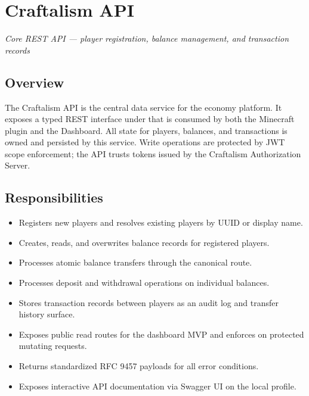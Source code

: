

\chapter{Craftalism API}
\label{ch:api}


\textcolor{CraftGray}{\textit{Core REST API — player registration, balance management, and transaction records}}

\bigskip

\section{Overview}

The Craftalism API is the central data service for the economy platform. It exposes a typed REST interface under  that is consumed by both the Minecraft plugin and the Dashboard. All state for players, balances, and transactions is owned and persisted by this service. Write operations are protected by JWT scope enforcement; the API trusts tokens issued by the Craftalism Authorization Server.

\section{Responsibilities}

\begin{itemize}
  \item Registers new players and resolves existing players by UUID or display name.
  \item Creates, reads, and overwrites balance records for registered players.
  \item Processes atomic balance transfers through the canonical  route.
  \item Processes deposit and withdrawal operations on individual balances.
  \item Stores transaction records between players as an audit log and transfer history surface.
  \item Exposes public read routes for the dashboard MVP and enforces  on protected mutating requests.
  \item Returns standardized RFC 9457  payloads for all error conditions.
  \item Exposes interactive API documentation via Swagger UI on the local profile.
\end{itemize}

